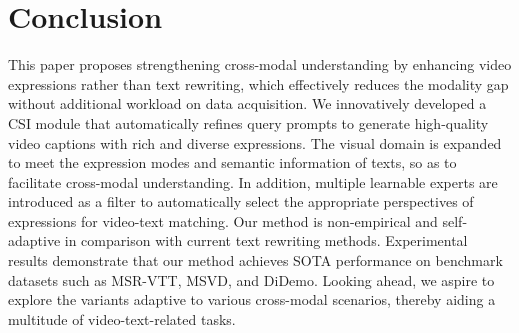 
\section{Conclusion}



This paper proposes strengthening cross-modal understanding by enhancing video expressions rather than text rewriting, which effectively reduces the modality gap without additional workload on data acquisition.
We innovatively developed a CSI module that automatically refines query prompts to generate high-quality video captions with rich and diverse expressions.   The visual domain is expanded to meet the expression modes and semantic information of texts, so as to facilitate cross-modal understanding.
In addition, multiple learnable experts are introduced as a filter to automatically select the appropriate perspectives of expressions for video-text matching.    Our method is non-empirical and self-adaptive in comparison with current text rewriting methods.
Experimental results demonstrate that our method achieves SOTA performance on benchmark datasets such as MSR-VTT, MSVD, and DiDemo.    Looking ahead, we aspire to explore the variants adaptive to various cross-modal scenarios, thereby aiding a multitude of video-text-related tasks.